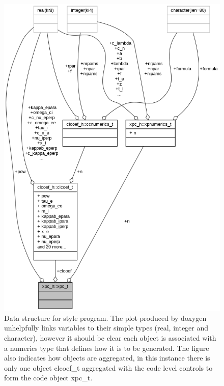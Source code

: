 \begin{figure}
\centerline{\includegraphics[width=12cm]{../pics/xpch}}
\caption{Data structure for  style program. The plot produced by doxygen
unhelpfully links variables to their simple types (real, integer and character),
however it should be clear each object is associated with a numerics type that
defines how it is to be generated. The figure also indicates how objects are aggregated,
in this instance there is only one object clcoef\_t aggregated with the code level
controls to form the code object xpc\_t.
\label{fig:xpch}}
\end{figure}

